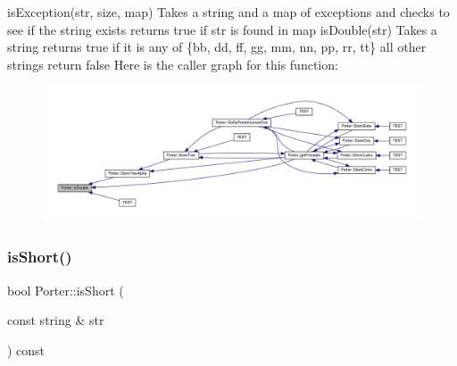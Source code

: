 is\+Exception(str, size, map) Takes a string and a map of exceptions and checks to see if the string exists returns true if str is found in map is\+Double(str) Takes a string returns true if it is any of \{\textquotesingle{}bb\textquotesingle{}, \textquotesingle{}dd\textquotesingle{}, \textquotesingle{}ff\textquotesingle{}, \textquotesingle{}gg\textquotesingle{}, \textquotesingle{}mm\textquotesingle{}, \textquotesingle{}nn\textquotesingle{}, \textquotesingle{}pp\textquotesingle{}, \textquotesingle{}rr\textquotesingle{}, \textquotesingle{}tt\textquotesingle{}\} all other strings return false Here is the caller graph for this function\+:
\nopagebreak
\begin{figure}[H]
\begin{center}
\leavevmode
\includegraphics[width=350pt]{class_porter_a7c8a4b3b6103ce655e8ffc8a3eba1897_icgraph}
\end{center}
\end{figure}
\mbox{\label{class_porter_a35b1cc5606d4e78d1f69ac4037fdde87}} 
\subsubsection{\texorpdfstring{is\+Short()}{isShort()}}
{\footnotesize\ttfamily bool Porter\+::is\+Short (\begin{DoxyParamCaption}\item[{const string \&}]{str }\end{DoxyParamCaption}) const}

